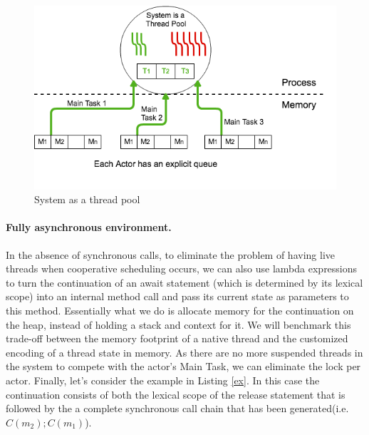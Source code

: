 \begin{figure}
	\centering
	\includegraphics[scale=0.6]{stp.png}
	\caption{System as a thread pool}
	\label{stp}
	
\end{figure}

\paragraph{Fully asynchronous environment.}
In the absence of synchronous calls, to eliminate the problem of having live threads when cooperative scheduling occurs, we can also use lambda expressions to turn the continuation of an await statement (which is determined by its lexical scope) into an internal method call and pass its current state as parameters to this method. Essentially what we do is allocate memory for the continuation on the heap, instead of holding a stack and context for it. We will benchmark this trade-off between the memory footprint of a native thread and the customized encoding of a thread state in memory. As there are no more suspended threads in the system to compete with the actor's Main Task, we can eliminate the lock per actor. Finally, let's consider the example in Listing \ref{ex}. In this case the continuation consists of both the lexical scope of the release statement that is followed by the a complete synchronous call chain that has been generated(i.e. $C(m_2);C(m_1)$). 

 
